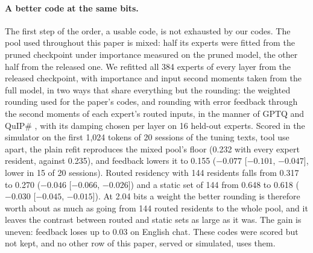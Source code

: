 \documentclass[11pt]{article}
\newcommand{\ci}[2]{[$#1$, $#2$]}
\begin{document}
\paragraph{A better code at the same bits.} The first step of the order, a usable code, is not exhausted by our codes. The pool used throughout this paper is mixed: half its experts were fitted from the pruned checkpoint under importance measured on the pruned model, the other half from the released one. We refitted all 384 experts of every layer from the released checkpoint, with importance and input second moments taken from the full model, in two ways that share everything but the rounding: the weighted rounding used for the paper's codes, and rounding with error feedback through the second moments of each expert's routed inputs, in the manner of GPTQ and QuIP\# \citep{frantar2023optq,tseng2024quipsharp}, with its damping chosen per layer on 16 held-out experts. Scored in the simulator on the first 1{,}024 tokens of 20 sessions of the tuning texts, tool use apart, the plain refit reproduces the mixed pool's floor (0.232 with every expert resident, against 0.235), and feedback lowers it to 0.155 ($-0.077$ \ci{-0.101}{-0.047}, lower in 15 of 20 sessions). Routed residency with 144 residents falls from 0.317 to 0.270 ($-0.046$ \ci{-0.066}{-0.026}) and a static set of 144 from 0.648 to 0.618 ($-0.030$ \ci{-0.045}{-0.015}). At 2.04 bits a weight the better rounding is therefore worth about as much as going from 144 routed residents to the whole pool, and it leaves the contrast between routed and static sets as large as it was. The gain is uneven: feedback loses up to 0.03 on English chat. These codes were scored but not kept, and no other row of this paper, served or simulated, uses them.
\end{document}
